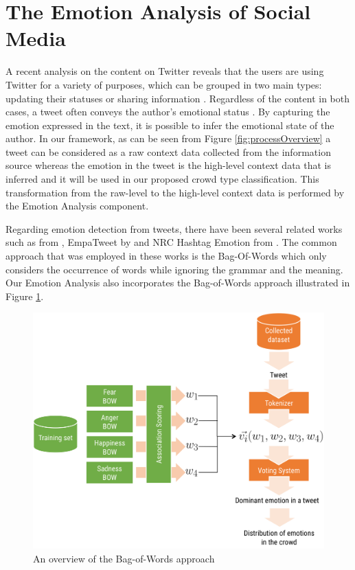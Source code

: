 \section{The Emotion Analysis of Social Media}

A recent analysis on the content on Twitter reveals that the users are using Twitter for a variety of purposes, which can be grouped in two main types: updating their statuses or sharing information \citep{java2007we}. Regardless of the content in both cases, a tweet often conveys the author's emotional status \citep{bollen2009modeling}. By capturing the emotion expressed in the text, it is possible to infer the emotional state of the author. In our framework, as can be seen from Figure \ref{fig:processOverview} a tweet can be considered as a raw context data collected from the information source whereas the emotion in the tweet is the high-level context data that is inferred and it will be used in our proposed crowd type classification. This transformation from the raw-level to the high-level context data is performed by the Emotion Analysis component. 

Regarding emotion detection from tweets, there have been several related works such as from \citet{bollen2009modeling}, EmpaTweet by \citet{roberts2012empatweet} and NRC Hashtag Emotion from \citet{mohammad2014using}. The common approach that was employed in these works is the Bag-Of-Words which only considers the occurrence of words while ignoring the grammar and the meaning. Our Emotion Analysis also incorporates the Bag-of-Words approach illustrated in Figure \ref{fig:bagOfWord}.

\begin{figure}[htb!] 
\centering    
\includegraphics[width=1.0\textwidth]{BagOfWord}
\caption{An overview of the Bag-of-Words approach}
\label{fig:bagOfWord}
\end{figure}

